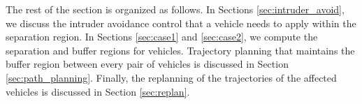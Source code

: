The rest of the section is organized as follows. In Sections \ref{sec:intruder_avoid}, we discuss the intruder avoidance control that a vehicle needs to apply within the separation region. In Sections \ref{sec:case1} and \ref{sec:case2}, we compute the separation and buffer regions for vehicles. 
Trajectory planning that maintains the buffer region between every pair of vehicles is discussed in Section \ref{sec:path_planning}. Finally, the replanning of the trajectories of the affected vehicles is discussed in Section \ref{sec:replan}. 

